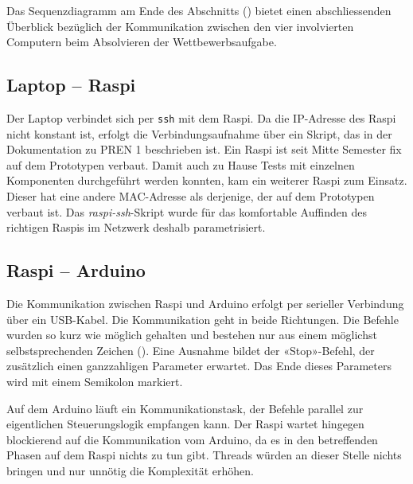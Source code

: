 Das Sequenzdiagramm am Ende des Abschnitts () bietet einen abschliessenden Überblick bezüglich der Kommunikation zwischen den vier involvierten Computern beim Absolvieren der Wettbewerbsaufgabe.

\subsection{Laptop -- Raspi}

Der Laptop verbindet sich per \texttt{ssh} mit dem Raspi. Da die IP-Adresse des Raspi nicht konstant ist, erfolgt die Verbindungsaufnahme über ein Skript, das in  der Dokumentation zu PREN 1 \cite[S. 34]{pren1} beschrieben ist. Ein Raspi ist seit Mitte Semester fix auf dem Prototypen verbaut. Damit auch zu Hause Tests mit einzelnen Komponenten durchgeführt werden konnten, kam ein weiterer Raspi zum Einsatz. Dieser hat eine andere MAC-Adresse als derjenige, der auf dem Prototypen verbaut ist. Das \textit{raspi-ssh}-Skript wurde für das komfortable Auffinden des richtigen Raspis im Netzwerk deshalb parametrisiert.

\subsection{Raspi -- Arduino}
\label{sec:raspi-arduino}

Die Kommunikation zwischen Raspi und Arduino erfolgt per serieller Verbindung über ein USB-Kabel. Die Kommunikation geht in beide Richtungen. Die Befehle wurden so kurz wie möglich gehalten und bestehen nur aus einem möglichst selbstsprechenden Zeichen (). Eine Ausnahme bildet der «Stop»-Befehl, der zusätzlich einen ganzzahligen Parameter erwartet. Das Ende dieses Parameters wird mit einem Semikolon markiert.

Auf dem Arduino läuft ein Kommunikationstask, der Befehle parallel zur eigentlichen Steuerungslogik empfangen kann. Der Raspi wartet hingegen blockierend auf die Kommunikation vom Arduino, da es in den betreffenden Phasen auf dem Raspi nichts zu tun gibt. Threads würden an dieser Stelle nichts bringen und nur unnötig die Komplexität erhöhen.

